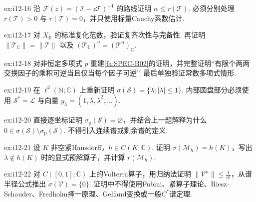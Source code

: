 \begin{FAExercise}[谱半径反向不等式]{ex:i12-16}
沿 \(\displaystyle \mathcal F(z)=(\mathcal I-z\mathcal T)^{-1}\) 的路线证明 \(\displaystyle \alpha\leqslant r(\mathcal T)\). 必须分别处理 \(\displaystyle r(\mathcal T)>0\) 与 \(\displaystyle r(\mathcal T)=0\)，并只使用标量Cauchy系数估计.
\end{FAExercise}

\begin{FAExercise}[实空间复化]{ex:i12-17}
对 \(\displaystyle X_{\mathbb R}\) 的标准复化范数，验证复齐次性与完备性. 再证明 \(\displaystyle \|\mathcal T_{\mathbb C}\|=\|\mathcal T\|\) 以及 \(\displaystyle (\mathcal T_{\mathbb C})^n=(\mathcal T^n)_{\mathbb C}\).
\end{FAExercise}

\begin{FAExercise}[多项式谱映射]{ex:i12-18}
对非恒定多项式 \(\displaystyle p\) 重建\autoref{fa:SPEC-B02}的证明，并完整证明“有限个两两交换因子的乘积可逆当且仅当每个因子可逆”. 最后单独验证常数多项式情形.
\end{FAExercise}

\begin{FAExercise}[右移的谱]{ex:i12-19}
在 \(\displaystyle \ell^2(\mathbb N;\mathbb C)\) 上重新证明 \(\displaystyle \sigma(\mathcal S)=\{\lambda:|\lambda|\leqslant1\}\). 内部圆盘部分必须使用 \(\displaystyle \mathcal S^*=\mathcal L\) 与向量 \(\displaystyle y_\lambda=(1,\overline\lambda,\overline\lambda^2,\dots)\).
\end{FAExercise}

\begin{FAExercise}[右移没有特征值]{ex:i12-20}
直接逐坐标证明 \(\displaystyle \sigma_{\mathrm p}(\mathcal S)=\varnothing\)，并结合上一题解释为什么 \(\displaystyle 0\in\sigma(\mathcal S)\setminus\sigma_{\mathrm p}(\mathcal S)\). 不得引入连续谱或剩余谱的定义.
\end{FAExercise}

\begin{FAExercise}[乘法算子谱]{ex:i12-21}
设 \(\displaystyle K\) 非空紧Hausdorff，\(\displaystyle h\in C(K;\mathbb C)\). 证明 \(\displaystyle \sigma(\mathcal M_h)=h(K)\)，写出 \(\displaystyle \lambda\notin h(K)\) 时的显式预解算子，并计算 \(\displaystyle r(\mathcal M_h)\).
\end{FAExercise}

\begin{FAExercise}[Volterra谱与后续理论边界]{ex:i12-22}
对 \(\displaystyle C([0,1];\mathbb C)\) 上的Volterra算子，用归纳法证明 \(\displaystyle \|\mathcal V^n\|\leqslant\frac{1}{n!}\)，从谱半径公式推出 \(\displaystyle \sigma(\mathcal V)=\{0\}\). 证明中不得使用Fubini、紧算子理论、Riesz--Schauder、Fredholm择一原理、Gelfand变换或一般\(\displaystyle C^*\)谱定理.
\end{FAExercise}

